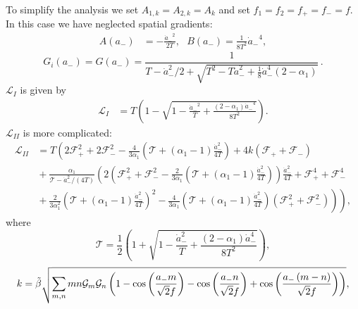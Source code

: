 \documentclass[a4paper,11pt]{article}
\begin{document}
  To simplify the analysis we  set $A_{1,k} = A_{2,k} = A_k$ and set $f_1 = f_2 = f_+ = f_- = f$.
  In this case we have neglected spatial gradients:
  \begin{align}
    A( a_-)& = -\frac{{\dot{a}_-}^2}{2T},
    ~~~B(a_-) = \frac{1}{8 T^2}  {\dot a_-}^4,
    \label{const3}
  \end{align}
  \begin{equation}
    G_i\left(a_-\right)= G\left(a_-\right)
    = \frac{1}{ T- \dot a_-^2/2 + \sqrt{T^2- T \dot a_-^2 + \frac{1}{8} {\dot a}_{-}^4 \left(2 - \alpha_1\right)}}\,.
    \label{const5}
  \end{equation}
  $\mathcal{L}_I$ is given by
  \begin{align} \label{eq.axionLagrangian.I}
    \mathcal{L}_{I} &= T \left(1-\sqrt{1-\frac{{\dot a_{-}}^2}{T}+\frac{\left(2-\alpha_1\right){\dot a_{-}}^4}{8 T^2}} \right).
  \end{align}
  $\mathcal{L}_{II}$ is more complicated:
\begin{equation}
  \begin{split} \label{eq.axionLagrangian.II}
    \mathcal{L}_{II} &= T \left(2\mathcal{F}_{+}^2+2\mathcal{F}_{-}^2-\frac{4}{3\alpha_1}\left(\mathcal{T}+\left(\alpha_1-1\right)\frac{{\dot{a}}_{-}^2}{4 T}\right) + 4k \left(\mathcal{F}_{+}+\mathcal{F}_{-}\right) \right. \\
    & \left.{}+\frac{\alpha_1}{\mathcal{T}-{\dot{a}}_{-}^2/\left(4T\right)}\left(2\left(\mathcal{F}_{+}^2+\mathcal{F}_{-}^2-\frac{2}{3\alpha_1}\left(\mathcal{T}+\left(\alpha_1-1\right)\frac{{\dot{a}}_{-}^2}{4 T}\right)\right)\frac{{\dot{a}}_{-}^2}{4 T} +\mathcal{F}_{+}^4+\mathcal{F}_{-}^4 \right.\right. \\
    & \left.\left.{}+\frac{2}{3\alpha_1^2}{\left(\mathcal{T}+\left(\alpha_1-1\right)\frac{{\dot{a}}_{-}^2}{4 T}\right)}^2-\frac{4}{3\alpha_1}\left(\mathcal{T}+\left(\alpha_1-1\right)\frac{{\dot{a}}_{-}^2}{4 T}\right)\left(\mathcal{F}_{+}^2+\mathcal{F}_{-}^2\right)\right)\right),
  \end{split}
  \end{equation}
  where
  \begin{equation}
    \mathcal{T}=\frac{1}{2} \left(1+\sqrt{1-\frac{{\dot{a}}_{-}^2}{T}+\frac{\left(2-\alpha_1\right){\dot{a}}_{-}^4}{8 T^2}}\right),
    \label{lag12a}
  \end{equation}
  \begin{equation}
    k=\tilde\beta \sqrt{\sum_{m, n}m n {\cal{G}}_m {\cal {G}}_n \left(1-\cos\left(\frac{a_- m}{\sqrt 2 f}\right)-\cos\left(\frac{a_- n}{\sqrt 2 f}\right)+\cos\left(\frac{a_- \left(m-n\right)}{\sqrt 2 f}\right)\right)},
    \label{lag12b}
  \end{equation}
\end{document}
